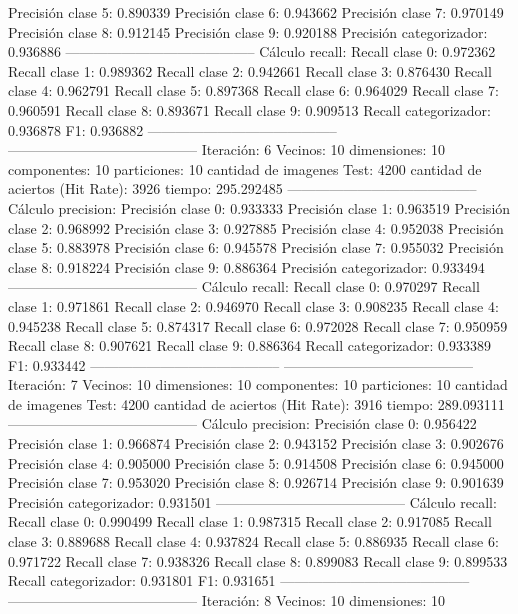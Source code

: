 Precisión clase 5: 0.890339
Precisión clase 6: 0.943662
Precisión clase 7: 0.970149
Precisión clase 8: 0.912145
Precisión clase 9: 0.920188
Precisión categorizador: 0.936886
-----------------------------------------
Cálculo recall: 
Recall clase 0: 0.972362
Recall clase 1: 0.989362
Recall clase 2: 0.942661
Recall clase 3: 0.876430
Recall clase 4: 0.962791
Recall clase 5: 0.897368
Recall clase 6: 0.964029
Recall clase 7: 0.960591
Recall clase 8: 0.893671
Recall clase 9: 0.909513
Recall categorizador: 0.936878
F1: 0.936882
-----------------------------------------
-----------------------------------------
Iteración: 6
Vecinos: 10
dimensiones: 10
componentes: 10
particiones: 10
cantidad de imagenes Test: 4200
cantidad de aciertos (Hit Rate): 3926
tiempo: 295.292485
-----------------------------------------
Cálculo precision: 
Precisión clase 0: 0.933333
Precisión clase 1: 0.963519
Precisión clase 2: 0.968992
Precisión clase 3: 0.927885
Precisión clase 4: 0.952038
Precisión clase 5: 0.883978
Precisión clase 6: 0.945578
Precisión clase 7: 0.955032
Precisión clase 8: 0.918224
Precisión clase 9: 0.886364
Precisión categorizador: 0.933494
-----------------------------------------
Cálculo recall: 
Recall clase 0: 0.970297
Recall clase 1: 0.971861
Recall clase 2: 0.946970
Recall clase 3: 0.908235
Recall clase 4: 0.945238
Recall clase 5: 0.874317
Recall clase 6: 0.972028
Recall clase 7: 0.950959
Recall clase 8: 0.907621
Recall clase 9: 0.886364
Recall categorizador: 0.933389
F1: 0.933442
-----------------------------------------
-----------------------------------------
Iteración: 7
Vecinos: 10
dimensiones: 10
componentes: 10
particiones: 10
cantidad de imagenes Test: 4200
cantidad de aciertos (Hit Rate): 3916
tiempo: 289.093111
-----------------------------------------
Cálculo precision: 
Precisión clase 0: 0.956422
Precisión clase 1: 0.966874
Precisión clase 2: 0.943152
Precisión clase 3: 0.902676
Precisión clase 4: 0.905000
Precisión clase 5: 0.914508
Precisión clase 6: 0.945000
Precisión clase 7: 0.953020
Precisión clase 8: 0.926714
Precisión clase 9: 0.901639
Precisión categorizador: 0.931501
-----------------------------------------
Cálculo recall: 
Recall clase 0: 0.990499
Recall clase 1: 0.987315
Recall clase 2: 0.917085
Recall clase 3: 0.889688
Recall clase 4: 0.937824
Recall clase 5: 0.886935
Recall clase 6: 0.971722
Recall clase 7: 0.938326
Recall clase 8: 0.899083
Recall clase 9: 0.899533
Recall categorizador: 0.931801
F1: 0.931651
-----------------------------------------
-----------------------------------------
Iteración: 8
Vecinos: 10
dimensiones: 10
